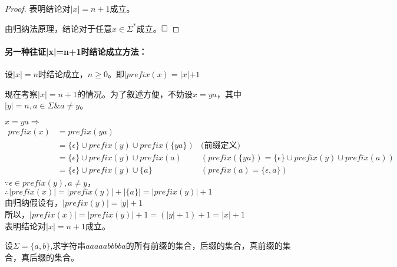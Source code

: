 \begin{solution}
\begin{proof}
		表明结论对$|x|=n+1$成立。
		
		由归纳法原理，结论对于任意$x\in\Sigma^\ast$成立。$\hfill\square$	
	\end{proof}
    
    \paragraph{另一种往证|x|=n+1时结论成立方法：}
    设$|x|=n$时结论成立，$n\ge 0$。即$|prefix(x)=|x|+1$
     
    现在考察$|x|=n+1$的情况。为了叙述方便，不妨设$x=ya$，其中$|y|=n,a\in\Sigma\& a\ne y$。
    
    $x=ya\Rightarrow$
    \begin{align*}
      prefix(x)&=prefix(ya) &\\
               &=\{\epsilon\}\cup prefix(y) \cup prefix(\{ya\}) &\text{(前缀定义)}\\
               &=\{\epsilon\}\cup prefix(y) \cup prefix(a) & (prefix(\{ya\})=\{\epsilon\}\cup prefix(y)\cup prefix(a)) \\
               &=\{\epsilon\}\cup prefix(y) \cup \{a\} &  (prefix(a)=\{\epsilon,a\})
    \end{align*}
    $\because \epsilon\in prefix(y),a\ne y$，\\
    $\therefore |prefix(x)|= |prefix(y)| + |\{a\}| = |prefix(y)| + 1$\\
    由归纳假设有，$|prefix(y)|=|y|+1$\\
    所以，$|prefix(x)|= |prefix(y)| + 1 = (|y|+1)+1 = |x|+1$\\
    表明结论对$|x|=n+1$成立。
\end{solution}

\begin{exercise}
	设$\Sigma=\{a,b\}$,求字符串$aaaaabbbba$的所有前缀的集合，后缀的集合，真前缀的集合，真后缀的集合。
\end{exercise}

